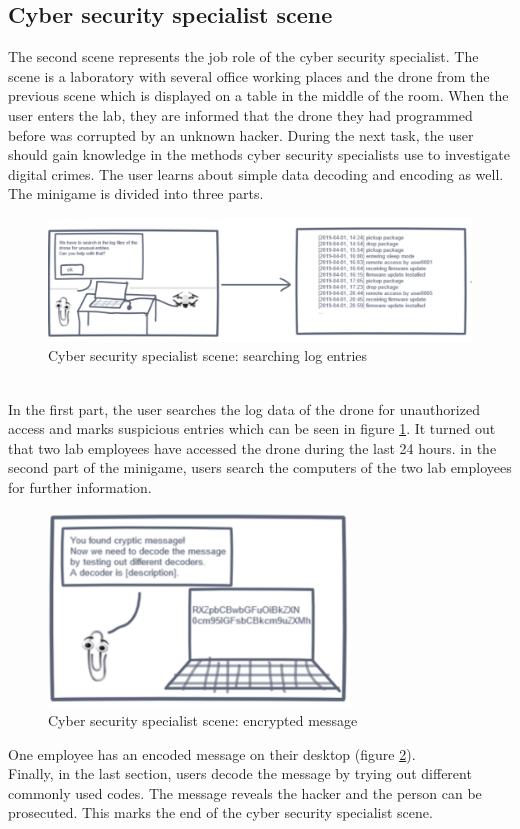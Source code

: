 \subsection{Cyber security specialist scene} 
The second scene represents the job role of the cyber security specialist. The scene is a laboratory with several office working places and the drone from the previous scene which is displayed on a table in the middle of the room. When the user enters the lab, they are informed that the drone they had programmed before was corrupted by an unknown hacker. During the next task, the user should gain knowledge in the methods cyber security specialists use to investigate digital crimes. The user learns about simple data decoding and encoding as well. The minigame is divided into three parts. 
\begin{figure}[h!]
  \includegraphics[width=16cm]{kapitel/storyboard/cyber-analyst1.pdf}
  \centering
  \caption{Cyber security specialist scene: searching log entries}
  \label{fig:logscene}
\end{figure}
\\In the first part, the user searches the log data of the drone for unauthorized access and marks suspicious entries which can be seen in figure \ref{fig:logscene}. It turned out that two lab employees have accessed the drone during the last 24 hours. in the second part of the minigame, users search the computers of the two lab employees for further information. 
\begin{figure}[h!]
  \includegraphics[width=8cm]{kapitel/storyboard/cyber-analyst3.pdf}
  \centering
  \caption{Cyber security specialist scene: encrypted message}
  \label{fig:logscene2}
\end{figure}
One employee has an encoded message on their desktop (figure \ref{fig:logscene2}).\\ Finally, in the last section, users decode the message by trying out different commonly used codes. The message reveals the hacker and the person can be prosecuted. This marks the end of the cyber security specialist scene.

